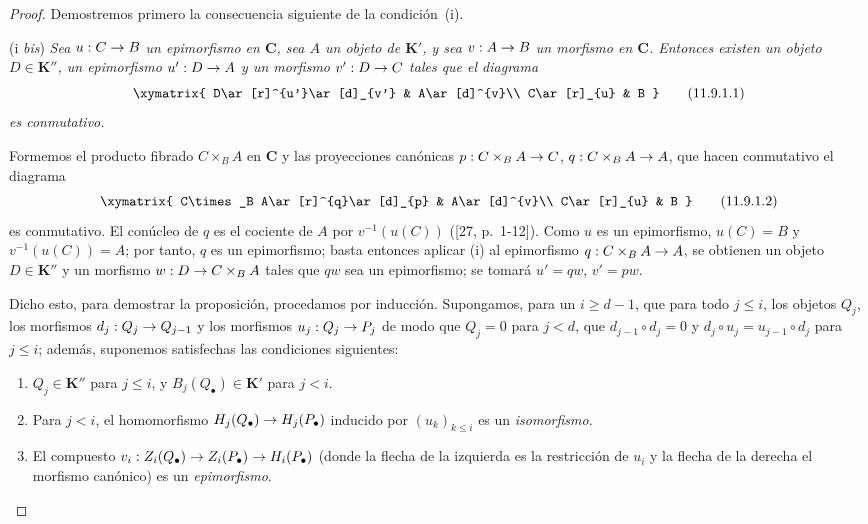 \documentclass[10pt,oneside,openany]{book}
\theoremstyle{egaenv}\newtheorem*{env}{---}
\theoremstyle{egastatement}
\theoremstyle{egadescription}
\newcommand{\oldpage}[2][]{\marginnote{\normalfont\scriptsize\textbf{#1}\,|\,#2}\ignorespaces}
\renewcommand{\leq}{\leqslant}
\renewcommand{\geq}{\geqslant}
\renewcommand{\to}{\mathchoice{\longrightarrow}{\rightarrow}{\rightarrow}{\rightarrow}}
\begin{document}
\begin{proof}
Demostremos primero la consecuencia siguiente de la condición~(i).

\medskip\noindent
(i \emph{bis})
\emph{Sea $u:C\to B$ un epimorfismo en $\boldsymbol{C}$, sea $A$ un
objeto de $\boldsymbol{K}'$, y sea $v:A\to B$ un morfismo en $\boldsymbol{C}$.
Entonces existen un objeto $D\in\boldsymbol{K}''$, un epimorfismo $u':D\to A$ y un
morfismo $v':D\to C$ tales que el diagrama}
\[
\xymatrix{
D\ar[r]^{u'}\ar[d]_{v'} & A\ar[d]^{v}\\
C\ar[r]_{u} & B
}
\tag{11.9.1.1}\label{0.11.9.1.1-fr}
\]
\emph{es conmutativo.}

Formemos el producto fibrado $C\times_B A$ en $\boldsymbol{C}$ y las proyecciones canónicas $p:C\times_B A\to C$, $q:C\times_B A\to A$, que hacen conmutativo el diagrama
\oldpage[0\textsubscript{III}]{47}
\[
\xymatrix{
C\times_B A\ar[r]^{q}\ar[d]_{p} & A\ar[d]^{v}\\
C\ar[r]_{u} & B
}
\tag{11.9.1.2}\label{0.11.9.1.2-fr}
\]
es conmutativo.
El conúcleo de $q$ es el cociente de $A$ por $v^{-1}(u(C))$
([27, p.~1-12]).
Como $u$ es un epimorfismo, $u(C)=B$ y
$v^{-1}(u(C))=A$; por tanto, $q$ es un epimorfismo; basta entonces aplicar (i) al epimorfismo $q:C\times_B A\to A$, se obtienen un objeto
$D\in\boldsymbol{K}''$ y un morfismo $w:D\to C\times_B A$ tales que $qw$ sea un epimorfismo; se tomará $u'=qw$, $v'=pw$.

Dicho esto, para demostrar la proposición, procedamos por inducción. Supongamos, para un $i\geq d-1$, que para todo $j\leq i$, los objetos $Q_j$, los morfismos $d_j:Q_j\to Q_{j-1}$ y los morfismos $u_j:Q_j\to P_j$ de modo que $Q_j=0$ para $j<d$, que $d_{j-1}\circ d_j=0$ y $d_j\circ u_j=u_{j-1}\circ d_j$ para $j\leq i$; además, suponemos satisfechas las condiciones siguientes:
\begin{enumerate}
\item[$(\mathrm I_i)$]
  $Q_j\in\boldsymbol{K}''$ para $j\leq i$, y
  $B_j(Q_\bullet)\in\boldsymbol{K}'$ para $j<i$.

  \item[$(\mathrm{II}_i)$]
  Para $j<i$, el homomorfismo
  $H_j(Q_\bullet)\to H_j(P_\bullet)$
  inducido por $(u_k)_{k\leq i}$ es un \emph{isomorfismo}.

  \item[$(\mathrm{III}_i)$]
  El compuesto
  $v_i:Z_i(Q_\bullet)\to Z_i(P_\bullet)
\to H_i(P_\bullet)$
(donde la flecha de la izquierda es la restricción de $u_i$ y la flecha de la derecha el morfismo canónico) es un \emph{epimorfismo}.
\end{enumerate}


\end{proof}
\end{document}
